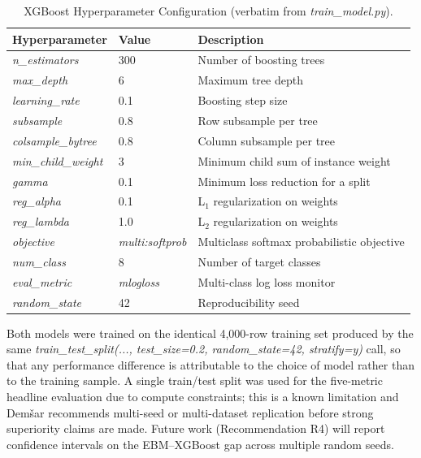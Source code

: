 \documentclass{icsthesis}
\begin{document}
\begin{mainmatter}
					\begin{table}[h]
					\vspace{4ex}
					\centering
					\caption{XGBoost Hyperparameter Configuration (verbatim from \emph{train\_model.py}).}
					\label{tab:xgb-hp}
					\footnotesize
					\begin{tabular}{|l|p{2.2cm}|p{2.7cm}|}
						\hline
						\textbf{Hyperparameter} & \textbf{Value} & \textbf{Description} \\
						\hline
						\emph{n\_estimators} & 300 & Number of boosting trees \\
						\emph{max\_depth} & 6 & Maximum tree depth \\
						\emph{learning\_rate} & 0.1 & Boosting step size \\
						\emph{subsample} & 0.8 & Row subsample per tree \\
						\emph{colsample\_bytree} & 0.8 & Column subsample per tree \\
						\emph{min\_child\_weight} & 3 & Minimum child sum of instance weight \\
						\emph{gamma} & 0.1 & Minimum loss reduction for a split \\
						\emph{reg\_alpha} & 0.1 & L$_1$ regularization on weights \\
						\emph{reg\_lambda} & 1.0 & L$_2$ regularization on weights \\
						\emph{objective} & \emph{multi:softprob} & Multiclass softmax probabilistic objective \\
						\emph{num\_class} & 8 & Number of target classes \\
						\emph{eval\_metric} & \emph{mlogloss} & Multi-class log loss monitor \\
						\emph{random\_state} & 42 & Reproducibility seed \\
						\hline
					\end{tabular}
					\vspace{4ex}
					\end{table}

					Both models were trained on the identical 4{,}000-row training set produced by the same \emph{train\_test\_split(..., test\_size=0.2, random\_state=42, stratify=y)} call, so that any performance difference is attributable to the choice of model rather than to the training sample. A single train/test split was used for the five-metric headline evaluation due to compute constraints; this is a known limitation and Dem\v{s}ar \cite{ref68} recommends multi-seed or multi-dataset replication before strong superiority claims are made. Future work (Recommendation R4) will report confidence intervals on the EBM--XGBoost gap across multiple random seeds.


\end{mainmatter}
\end{document}
